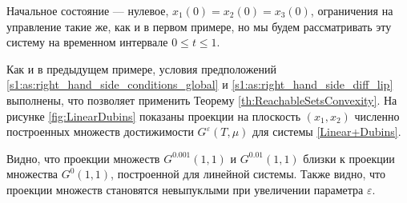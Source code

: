 \documentclass[../main.tex]{subfiles}
\begin{document}
    Начальное состояние --- нулевое, $x_1(0) = x_2(0) = x_3(0) $, ограничения на управление такие же, как и в первом примере, но мы будем рассматривать эту систему на временном интервале $0 \leqslant t \leqslant 1$.
    
    Как и в предыдущем примере, условия предположений \ref{s1:as:right_hand_side_conditions_global} и \ref{s1:as:right_hand_side_diff_lip} выполнены, что позволяет применить Теорему \ref{th:ReachableSetsConvexity}. 
    На рисунке \ref{fig:LinearDubins} показаны проекции на плоскость $(x_1,x_2)$ численно построенных множеств достижимости $G^{\varepsilon}(T,\mu)$ для системы \eqref{Linear+Dubins}. 
    
    Видно, что проекции множеств $G^{0.001}(1,1) $ и $G^{0.01}(1,1) $ близки к проекции множества $G^{0}(1,1) $, построенной для линейной системы. 
    Также видно, что проекции множеств становятся невыпуклыми при увеличении параметра $\varepsilon$. 
\end{document}
